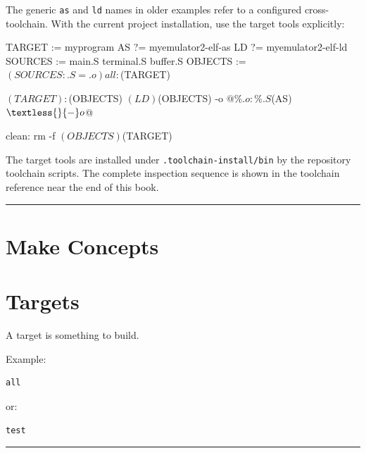\documentclass[
  oneside,
  openany]{book}
\newenvironment{Shaded}{\begin{snugshade}}{\end{snugshade}}
\newcommand{\NormalTok}[1]{#1}
\begin{document}
The generic \texttt{as} and \texttt{ld} names in older examples refer to
a configured cross-toolchain. With the current project installation, use
the target tools explicitly:

\begin{Shaded}
\begin{Highlighting}[]
\NormalTok{TARGET := myprogram}
\NormalTok{AS ?= myemulator2{-}elf{-}as}
\NormalTok{LD ?= myemulator2{-}elf{-}ld}
\NormalTok{SOURCES := main.S terminal.S buffer.S}
\NormalTok{OBJECTS := $(SOURCES:.S=.o)}

\NormalTok{all: $(TARGET)}

\NormalTok{$(TARGET): $(OBJECTS)}
\NormalTok{    $(LD) $(OBJECTS) {-}o $@}

\NormalTok{\%.o: \%.S}
\NormalTok{    $(AS) $\textless{} {-}o $@}

\NormalTok{clean:}
\NormalTok{    rm {-}f $(OBJECTS) $(TARGET)}
\end{Highlighting}
\end{Shaded}

The target tools are installed under \texttt{.toolchain-install/bin} by
the repository toolchain scripts. The complete inspection sequence is
shown in the toolchain reference near the end of this book.

\begin{center}\rule{0.5\linewidth}{0.5pt}\end{center}

\hypertarget{make-concepts}{%
\section{Make Concepts}\label{make-concepts}}

\hypertarget{targets-1}{%
\section{Targets}\label{targets-1}}

A target is something to build.

Example:

\begin{verbatim}
all
\end{verbatim}

or:

\begin{verbatim}
test
\end{verbatim}

\begin{center}\rule{0.5\linewidth}{0.5pt}\end{center}
\end{document}
